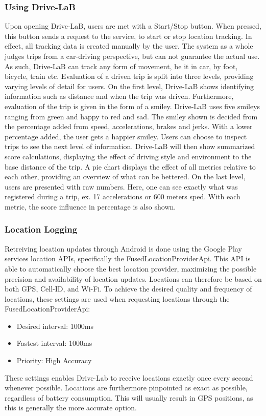 \subsubsection{Using Drive-LaB}\label{subsubsec:using_drivelab}
Upon opening Drive-LaB, users are met with a Start/Stop button. When pressed, this button sends a request to the service, to start or stop location tracking. In effect, all tracking data is created manually by the user. The system as a whole judges trips from a car-driving perspective, but can not guarantee the actual use. As such, Drive-LaB can track any form of movement, be it in car, by foot, bicycle, train etc.
Evaluation of a driven trip is split into three levels, providing varying levels of detail for users. On the first level, Drive-LaB shows identifying information such as distance and when the trip was driven. Furthermore, evaluation of the trip is given in the form of a smiley. Drive-LaB uses five smileys ranging from green and happy to red and sad. The smiley shown is decided from the percentage added from speed, accelerations, brakes and jerks. With a lower percentage added, the user gets a happier smiley.
Users can choose to inspect trips to see the next level of information. Drive-LaB will then show summarized score calculations, displaying the effect of driving style and environment to the base distance of the trip. A pie chart displays the effect of all metrics relative to each other, providing an overview of what can be bettered.
On the last level, users are presented with raw numbers. Here, one can see exactly what was registered during a trip, ex. 17 accelerations or 600 meters sped. With each metric, the score influence in percentage is also shown.

\subsubsection{Location Logging}\label{subsubsec:location_logging}
Retreiving location updates through Android is done using the Google Play services location APIs, specifically the FusedLocationProviderApi. This API is able to automatically choose the best location provider, maximizing the possible precision and availability of location updates. Locations can therefore be based on both GPS, Cell-ID, and Wi-Fi. To achieve the desired quality and frequency of locations, these settings are used when requesting locations through the FusedLocationProviderApi:

\begin{itemize}
\item Desired interval: 1000ms
\item Fastest interval: 1000ms
\item Priority: High Accuracy
\end{itemize}

These settings enables Drive-Lab to receive locations exactly once every second whenever possible. Locations are furthermore pinpointed as exact as possible, regardless of battery consumption. This will usually result in GPS positions, as this is generally the more accurate option.